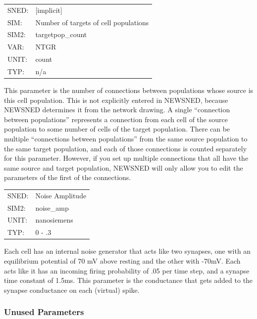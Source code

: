 \documentclass[12pt,openany,oneside]{book}
\begin{document}
\begin{flushleft}
\begin{tabular}{@{}ll@{}}
SNED: & [implicit]\\
SIM: & Number of targets of cell populations\\
SIM2: & targetpop\_count\\
VAR: & NTGR\\
UNIT: & count\\
TYP: & n/a\\
\end{tabular}
\end{flushleft}
\noindent
This parameter is the number of connections between populations whose
source is this cell population.  This is not explicitly entered in
NEWSNED, because NEWSNED determines it from the network drawing.  A
single ``connection between populations'' represents a connection from
each cell of the source population to some number of cells of the
target population.  There can be multiple ``connections between
populations'' from the same source population to the same target
population, and each of those connections is counted separately for
this parameter.  However, if you set up multiple connections that all
have the same source and target population, NEWSNED will only allow
you to edit the parameters of the first of the connections.
\filbreak
\vspace{\baselineskip}

\begin{flushleft}
\begin{tabular}{@{}ll@{}}
SNED: & Noise Amplitude\\
SIM2: & noise\_amp\\
UNIT: & nanosiemens\\
TYP: & 0 - .3\\
\end{tabular}
\end{flushleft}
\noindent
Each cell has an internal noise generator that acts like two synapses,
one with an equilibrium potential of 70 mV above resting and the other
with -70mV.  Each acts like it has an incoming firing probability of
.05 per time step, and a synapse time constant of 1.5ms.  This
parameter is the conductance that gets added to the synapse
conductance on each (virtual) spike.
\filbreak
\vspace{\baselineskip}

\subsubsection*{Unused Parameters}
\end{document}
